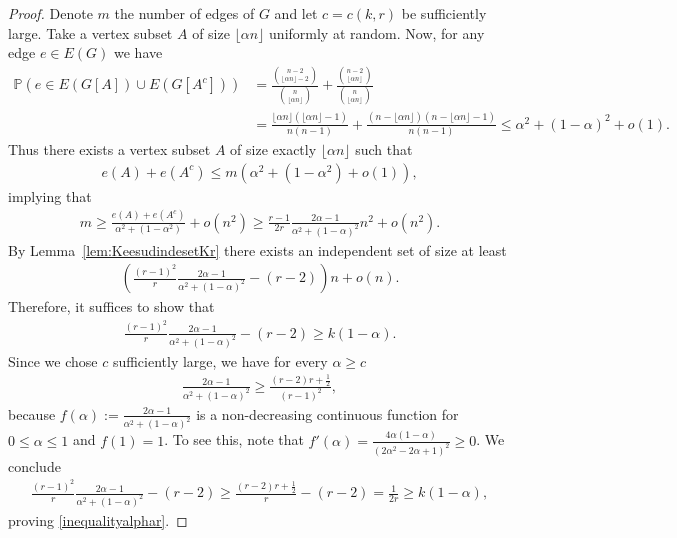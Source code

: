 \documentclass[11pt]{article}
\theoremstyle{definition}
\numberwithin{theo}{section}
\begin{document}
\begin{proof}
Denote $m$ the number of edges of $G$ and let $c=c(k,r)$ be sufficiently large. Take a vertex subset $A$ of size $\lfloor\alpha n\rfloor$ uniformly at random.  Now, for any edge $e\in E(G)$ we have
\begin{align*}
    \mathbb{P}(e\in E(G[A]) \cup E(G[A^c]))&= \frac{\binom{n-2}{\lfloor \alpha n\rfloor-2}}{\binom{n}{\lfloor \alpha n\rfloor}} + \frac{\binom{n-2}{\lfloor\alpha n\rfloor}}{\binom{n}{\lfloor \alpha n\rfloor}}\\
    &=\frac{\lfloor \alpha n\rfloor (\lfloor \alpha n\rfloor-1)}{n(n-1)}+ \frac{(n-\lfloor \alpha n \rfloor)(n-\lfloor \alpha n \rfloor-1)}{n(n-1)}\leq \alpha^2+(1-\alpha)^2+o(1).
\end{align*}
Thus there exists a vertex subset $A$ of size exactly $\lfloor\alpha n\rfloor$ such that 
\begin{align*}
    e(A)+e(A^c)\leq m(\alpha^2+(1-\alpha^2)+o(1)),
\end{align*}
implying that
\begin{align*}
    m\geq \frac{e(A)+e(A^c)}{\alpha^2+(1-\alpha^2)}+o(n^2)\geq  \frac{r-1}{2r}\frac{2\alpha-1}{\alpha^2+(1-\alpha)^2}n^2+o(n^2).
\end{align*}
By Lemma~\ref{lem:KeesudindesetKr} there exists an independent set of size at least
\begin{align*}
     \left(\frac{(r-1)^2}{r} \frac{2\alpha-1}{\alpha^2+(1-\alpha)^2}-(r-2)\right)n+o(n).
\end{align*}
Therefore, it suffices to show that
\begin{align}
\label{inequalityalphar}
        \frac{(r-1)^2}{r} \frac{2\alpha-1}{\alpha^2+(1-\alpha)^2}-(r-2)\geq k(1-\alpha).
\end{align}
Since we chose $c$ sufficiently large, we have for every $\alpha\geq c$
\begin{align*}
    \frac{2\alpha-1}{\alpha^2+(1-\alpha)^2} \geq \frac{(r-2)r+\frac{1}{2}}{(r-1)^2},
\end{align*}
because $f(\alpha):= \frac{2\alpha-1}{\alpha^2+(1-\alpha)^2}$ is a non-decreasing continuous function for $0\leq\alpha\leq1$ and $f(1)=1$. To see this, note that $f'(\alpha)=\frac{4\alpha(1-\alpha)}{(2\alpha^2-2\alpha+1)^2}\geq 0$. We conclude
\begin{align*}
    \frac{(r-1)^2}{r} \frac{2\alpha-1}{\alpha^2+(1-\alpha)^2}-(r-2)\geq \frac{(r-2)r+\frac{1}{2}}{r}-(r-2)=\frac{1}{2r}\geq k(1-\alpha),
\end{align*}
proving \eqref{inequalityalphar}.
\end{proof}
\end{document}
